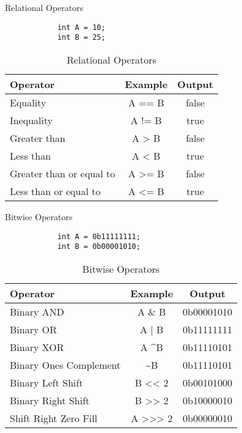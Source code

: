 \documentclass[10pt, compress]{beamer}
\begin{document}
\begin{slide}
	\begin{block}{Relational Operators}
		\begin{verbatim}
			int A = 10;
			int B = 25;
		\end{verbatim}
		\begin{table}
			\begin{tabular}{lcc}
				\toprule
				Operator & Example & Output\\
				\midrule
				Equality & A == B & false\\
				Inequality & A != B & true\\
				Greater than & A > B & false\\
				Less than & A < B & true\\
				Greater than or equal to & A >= B & false\\
				Less than or equal to & A <= B & true\\
				\bottomrule
			\end{tabular}
			\caption{Relational Operators}
		\end{table}
	\end{block}
\end{slide}

\begin{slide}
	\begin{block}{Bitwise Operators}
		\begin{verbatim}
			int A = 0b11111111;
			int B = 0b00001010;
		\end{verbatim}
		\begin{table}
			\begin{tabular}{lcc}
				\toprule
				Operator & Example & Output\\
				\midrule
				Binary AND & A \& B & 0b00001010\\
				Binary OR & A | B & 0b11111111\\
				Binary XOR & A \textasciicircum B & 0b11110101\\
				Binary Ones Complement & \textasciitilde B & 0b11110101\\
				Binary Left Shift & B <{}< 2 & 0b00101000\\
				Binary Right Shift & B >{}> 2 & 0b10000010\\
				Shift Right Zero Fill & A >{}>{}> 2 & 0b00000010 \\
				\bottomrule
			\end{tabular}
			\caption{Bitwise Operators}
		\end{table}
	\end{block}
\end{slide}
\end{document}

